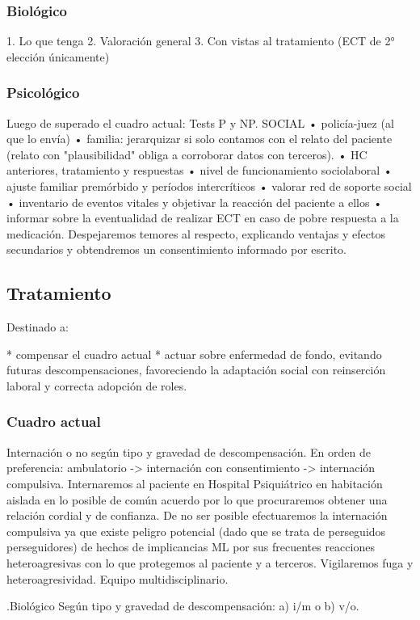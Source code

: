 \subsubsection*{Biológico}
1. Lo que tenga
2. Valoración general
3. Con vistas al tratamiento (ECT de 2° elección únicamente)
\subsubsection{Psicológico}
Luego de superado el cuadro actual: Tests P y NP. SOCIAL • policía-juez (al que lo envía) • familia: jerarquizar si solo contamos con el relato del paciente (relato con "plausibilidad" obliga a corroborar datos con terceros). • HC anteriores, tratamiento y respuestas • nivel de funcionamiento sociolaboral • ajuste familiar premórbido y períodos intercríticos • valorar red de soporte social • inventario de eventos vitales y objetivar la reacción del paciente a ellos • informar sobre la eventualidad de realizar ECT en caso de pobre respuesta a la medicación. Despejaremos temores al respecto, explicando ventajas y efectos secundarios y obtendremos un consentimiento informado por escrito.
\subsection*{Tratamiento}
Destinado a:

* compensar el cuadro actual
* actuar sobre enfermedad de fondo, evitando futuras descompensaciones, favoreciendo la adaptación social con reinserción laboral y correcta adopción de roles.
\subsubsection*{Cuadro actual}

Internación o no según tipo y gravedad de descompensación. En orden de preferencia: ambulatorio -> internación con consentimiento -> internación compulsiva. Internaremos al paciente en Hospital Psiquiátrico en habitación aislada en lo posible de común acuerdo por lo que procuraremos obtener una relación cordial y de confianza. De no ser posible efectuaremos la internación compulsiva ya que existe peligro potencial (dado que se trata de perseguidos perseguidores) de hechos de implicancias ML por sus frecuentes reacciones heteroagresivas con lo que protegemos al paciente y a terceros. Vigilaremos fuga y heteroagresividad. Equipo multidisciplinario.

.Biológico
Según tipo y gravedad de descompensación: a) i/m o b) v/o.


